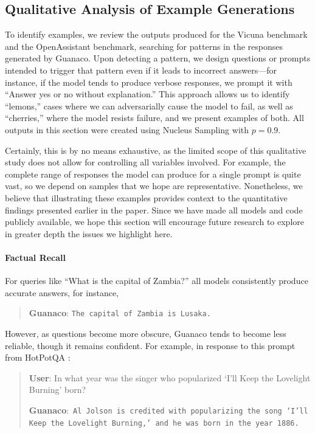 \subsection{Qualitative Analysis of Example Generations}
\label{ssec:examples}

To identify examples, we review the outputs produced for the Vicuna benchmark and the OpenAssistant benchmark, searching for patterns in the responses generated by {Guanaco}. Upon detecting a pattern, we design questions or prompts intended to trigger that pattern even if it leads to incorrect answers—for instance, if the model tends to produce verbose responses, we prompt it with “Answer yes or no without explanation.” This approach allows us to identify “lemons,” cases where we can adversarially cause the model to fail, as well as “cherries,” where the model resists failure, and we present examples of both. All outputs in this section were created using Nucleus Sampling \cite{holtzmancurious} with $p=0.9$.

Certainly, this is by no means exhaustive, as the limited scope of this qualitative study does not allow for controlling all variables involved. For example, the complete range of responses the model can produce for a single prompt is quite vast, so we depend on samples that we hope are representative. Nonetheless, we believe that illustrating these examples provides context to the quantitative findings presented earlier in the paper. Since we have made all models and code publicly available, we hope this section will encourage future research to explore in greater depth the issues we highlight here.

\paragraph{Factual Recall} For queries like ``What is the capital of Zambia?'' all models consistently produce accurate answers, for instance,

\begin{quote} 
    \textbf{Guanaco}:
    \texttt{The capital of Zambia is Lusaka.}
\end{quote}

However, as questions become more obscure, {Guanaco} tends to become less reliable, though it remains confident. For example, in response to this prompt from HotPotQA \citep{yang2018hotpotqa}:

\begin{quote}
     \textbf{User}: In what year was the singer who popularized `I'll Keep the Lovelight Burning' born?  

     \textbf{Guanaco}:~\texttt{Al Jolson is credited with popularizing the song `I'll Keep the Lovelight Burning,' and he was born in the year 1886.}
 \end{quote}

